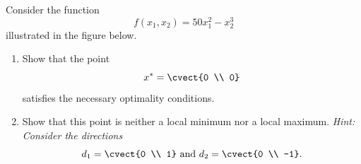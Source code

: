 

 Consider the function $$f(x_1,x_2)=50x_1^2-x_2^3$$ illustrated in the figure below.

\begin{center}
\end{center} 

\begin{enumerate}
\item Show that the point
  \[
  x^* =  \cvect{0 \\ 0}
  \]
  satisfies the necessary optimality conditions.

\item Show that this point is neither a local minimum nor a local maximum. 
  \textit{Hint: Consider the directions}
\[
    d_1=\cvect{0 \\ 1} \text{ and } d_2=\cvect{0 \\ -1}.
\]
\end{enumerate}


